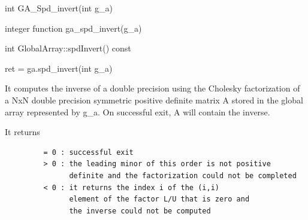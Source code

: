 \documentclass[12pt]{article}
\begin{document}

\begin{capi}
\begin{ccode}
int GA_Spd_invert(int g_a)
\end{ccode}
\begin{funcargs}
\end{funcargs}
\end{capi}

\begin{fapi}
\begin{fcode}
integer function ga_spd_invert(g_a)
\end{fcode}
\begin{funcargs}
\end{funcargs}
\end{fapi}

\begin{cxxapi}
\begin{cxxcode}
int GlobalArray::spdInvert() const
\end{cxxcode}
\begin{funcargs}
\end{funcargs}
\end{cxxapi}

\begin{pyapi}
\begin{pycode}
ret = ga.spd_invert(int g_a)
\end{pycode}
\begin{funcargs}
\end{funcargs}
\end{pyapi}

\gcoll

\begin{desc}

It computes the inverse of a double precision using the Cholesky factorization
of a NxN double precision symmetric positive definite matrix A stored in the
global array represented by g_a. On successful exit, A will contain the
inverse.

It returns
\begin{verbatim}
         = 0 : successful exit
         > 0 : the leading minor of this order is not positive
               definite and the factorization could not be completed
         < 0 : it returns the index i of the (i,i)
               element of the factor L/U that is zero and
               the inverse could not be computed
\end{verbatim}

\end{desc}
\end{document}
